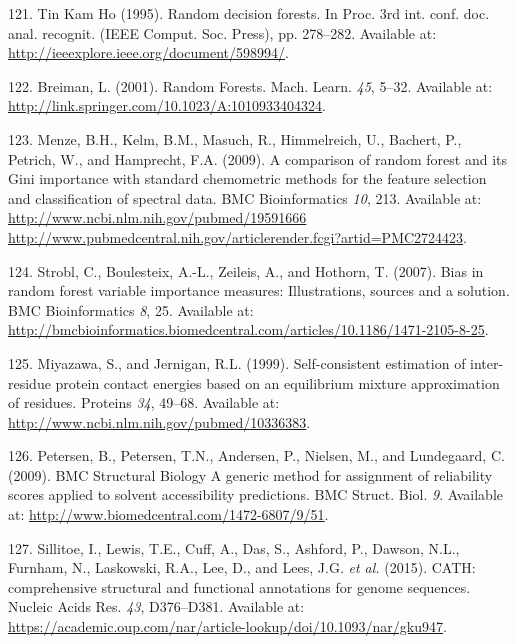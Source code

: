 \documentclass[12pt,a4paper,twoside]{book}
\theoremstyle{definition}
\theoremstyle{definition}
\theoremstyle{remark}
\begin{document}
\hypertarget{ref-TinKamHo}{}
121. Tin Kam Ho (1995). Random decision forests. In Proc. 3rd int. conf.
doc. anal. recognit. (IEEE Comput. Soc. Press), pp. 278--282. Available
at: \url{http://ieeexplore.ieee.org/document/598994/}.

\hypertarget{ref-Breiman2001}{}
122. Breiman, L. (2001). Random Forests. Mach. Learn. \emph{45}, 5--32.
Available at: \url{http://link.springer.com/10.1023/A:1010933404324}.

\hypertarget{ref-Menze2009}{}
123. Menze, B.H., Kelm, B.M., Masuch, R., Himmelreich, U., Bachert, P.,
Petrich, W., and Hamprecht, F.A. (2009). A comparison of random forest
and its Gini importance with standard chemometric methods for the
feature selection and classification of spectral data. BMC
Bioinformatics \emph{10}, 213. Available at:
\href{http://www.ncbi.nlm.nih.gov/pubmed/19591666\%20http://www.pubmedcentral.nih.gov/articlerender.fcgi?artid=PMC2724423}{http://www.ncbi.nlm.nih.gov/pubmed/19591666 http://www.pubmedcentral.nih.gov/articlerender.fcgi?artid=PMC2724423}.

\hypertarget{ref-Strobl2007}{}
124. Strobl, C., Boulesteix, A.-L., Zeileis, A., and Hothorn, T. (2007).
Bias in random forest variable importance measures: Illustrations,
sources and a solution. BMC Bioinformatics \emph{8}, 25. Available at:
\url{http://bmcbioinformatics.biomedcentral.com/articles/10.1186/1471-2105-8-25}.

\hypertarget{ref-Miyazawa1999a}{}
125. Miyazawa, S., and Jernigan, R.L. (1999). Self-consistent estimation
of inter-residue protein contact energies based on an equilibrium
mixture approximation of residues. Proteins \emph{34}, 49--68. Available
at: \url{http://www.ncbi.nlm.nih.gov/pubmed/10336383}.

\hypertarget{ref-Petersen2009a}{}
126. Petersen, B., Petersen, T.N., Andersen, P., Nielsen, M., and
Lundegaard, C. (2009). BMC Structural Biology A generic method for
assignment of reliability scores applied to solvent accessibility
predictions. BMC Struct. Biol. \emph{9}. Available at:
\url{http://www.biomedcentral.com/1472-6807/9/51}.

\hypertarget{ref-Sillitoe2015}{}
127. Sillitoe, I., Lewis, T.E., Cuff, A., Das, S., Ashford, P., Dawson,
N.L., Furnham, N., Laskowski, R.A., Lee, D., and Lees, J.G. \emph{et
al.} (2015). CATH: comprehensive structural and functional annotations
for genome sequences. Nucleic Acids Res. \emph{43}, D376--D381.
Available at:
\url{https://academic.oup.com/nar/article-lookup/doi/10.1093/nar/gku947}.
\end{document}
